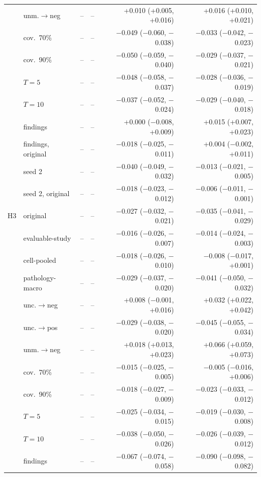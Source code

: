 \begin{longtable}{llrrrr}
 & unm.$\to$neg & -- & -- & +0.010 (+0.005, +0.016) & +0.016 (+0.010, +0.021)\\
 & cov.\ 70\% & -- & -- & $-$0.049 ($-$0.060, $-$0.038) & $-$0.033 ($-$0.042, $-$0.023)\\
 & cov.\ 90\% & -- & -- & $-$0.050 ($-$0.059, $-$0.040) & $-$0.029 ($-$0.037, $-$0.021)\\
 & $T=5$ & -- & -- & $-$0.048 ($-$0.058, $-$0.037) & $-$0.028 ($-$0.036, $-$0.019)\\
 & $T=10$ & -- & -- & $-$0.037 ($-$0.052, $-$0.024) & $-$0.029 ($-$0.040, $-$0.018)\\
 & findings & -- & -- & +0.000 ($-$0.008, +0.009) & +0.015 (+0.007, +0.023)\\
 & findings, original & -- & -- & $-$0.018 ($-$0.025, $-$0.011) & +0.004 ($-$0.002, +0.011)\\
 & seed 2 & -- & -- & $-$0.040 ($-$0.049, $-$0.032) & $-$0.013 ($-$0.021, $-$0.005)\\
 & seed 2, original & -- & -- & $-$0.018 ($-$0.023, $-$0.012) & $-$0.006 ($-$0.011, $-$0.001)\\
\midrule
H3 & original & -- & -- & $-$0.027 ($-$0.032, $-$0.021) & $-$0.035 ($-$0.041, $-$0.029)\\
 & evaluable-study & -- & -- & $-$0.016 ($-$0.026, $-$0.007) & $-$0.014 ($-$0.024, $-$0.003)\\
 & cell-pooled & -- & -- & $-$0.018 ($-$0.026, $-$0.010) & $-$0.008 ($-$0.017, +0.001)\\
 & pathology-macro & -- & -- & $-$0.029 ($-$0.037, $-$0.020) & $-$0.041 ($-$0.050, $-$0.032)\\
 & unc.$\to$neg & -- & -- & +0.008 ($-$0.001, +0.016) & +0.032 (+0.022, +0.042)\\
 & unc.$\to$pos & -- & -- & $-$0.029 ($-$0.038, $-$0.020) & $-$0.045 ($-$0.055, $-$0.034)\\
 & unm.$\to$neg & -- & -- & +0.018 (+0.013, +0.023) & +0.066 (+0.059, +0.073)\\
 & cov.\ 70\% & -- & -- & $-$0.015 ($-$0.025, $-$0.005) & $-$0.005 ($-$0.016, +0.006)\\
 & cov.\ 90\% & -- & -- & $-$0.018 ($-$0.027, $-$0.009) & $-$0.023 ($-$0.033, $-$0.012)\\
 & $T=5$ & -- & -- & $-$0.025 ($-$0.034, $-$0.015) & $-$0.019 ($-$0.030, $-$0.008)\\
 & $T=10$ & -- & -- & $-$0.038 ($-$0.050, $-$0.026) & $-$0.026 ($-$0.039, $-$0.012)\\
 & findings & -- & -- & $-$0.067 ($-$0.074, $-$0.058) & $-$0.090 ($-$0.098, $-$0.082)\\

\end{longtable}
